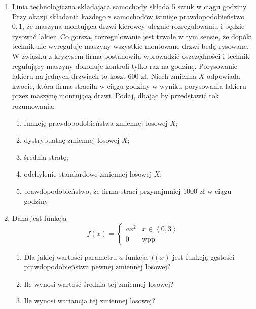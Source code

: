 \documentclass{mwart}
\begin{document}
\begin{enumerate}
\begin{enumerate}
\end{enumerate}
\item Linia technologiczna składająca samochody składa 5 sztuk w ciągu godziny. Przy okazji składania każdego
z samochodów istnieje prawdopodobieństwo $0{,}1$, że maszyna montująca drzwi kierowcy ulegnie rozregulowaniu
i będzie rysować lakier. Co gorsza, rozregulowanie jest trwałe w tym sensie, że dopóki technik nie wyreguluje
maszyny wszystkie montowane drzwi będą rysowane. W związku z kryzysem firma postanowiła wprowadzić
oszczędności i technik regulujący maszyny dokonuje kontroli tylko raz na godzinę. Porysowanie lakieru na jednych
drzwiach to koszt 600 zł. Niech zmienna $X$ odpowiada kwocie, która firma straciła w ciągu godziny w wyniku
porysowania lakieru przez maszynę montującą drzwi. Podaj, dbając by przedstawić tok rozumowania:
\begin{enumerate}
\item funkcję prawdopodobieństwa zmiennej losowej $X$;
\item dystrybuatnę zmiennej losowej $X$;
\item średnią stratę;
\item odchylenie standardowe zmiennej losowej $X$;
\item prawdopodobieństwo, że firma straci przynajmniej 1000 zł w ciągu godziny
\end{enumerate}

\item Dana jest funkcja 
\[ f(x)=\begin{cases} ax^2 & x\in \left<0,3\right> \\ 0 & \text{wpp} \end{cases} \]
\begin{enumerate}
\item Dla jakiej wartości parametru $a$ funkcja $f(x)$ jest funkcją gęstości prawdopodobieństwa pewnej zmiennej losowej?
\item Ile wynosi wartość średnia tej zmiennej losowej?
\item Ile wynosi wariancja tej zmiennej losowej?
\end{enumerate}


\end{enumerate}

\clearpage
\end{document}
